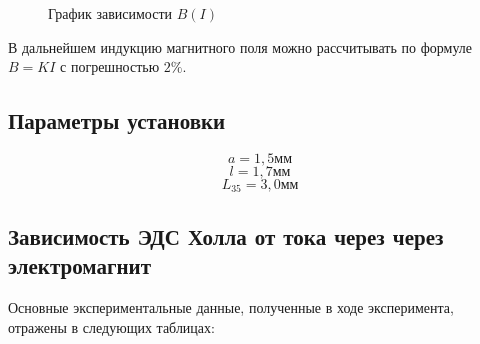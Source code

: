 \documentclass[a4paper, 12pt]{article}
\begin{document}
{\begin {figure}[H]
\begin{center}


\caption{График зависимости $B(I)$}
\end{center}

\end {figure}

В дальнейшем индукцию магнитного поля можно рассчитывать по формуле $B=KI$ с погрешностью $2\%$.

\subsection*{Параметры установки}
$$a = 1,5\text{мм}$$
$$l = 1,7\text{мм}$$
$$L_{35} = 3,0\text{мм}$$

\subsection*{Зависимость ЭДС Холла от тока через через электромагнит}
Основные экспериментальные данные, полученные в ходе эксперимента, отражены в следующих таблицах:

}
\end{document}
